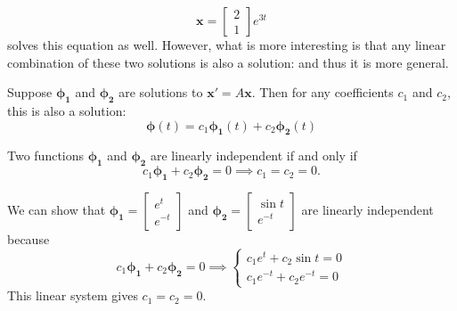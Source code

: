 \begin{itemize}
\begin{example}
              \begin{equation}
                  \bm{x} = \begin{bmatrix}
                      2 \\ 1
                  \end{bmatrix}e^{3t}
              \end{equation}
              solves this equation as well. However, what is more interesting is that any linear combination of these two solutions is also a solution: and thus it is more general.
          \end{example}
          \begin{theorem}
              Suppose $\bm{\phi_1}$ and $\bm{\phi_2}$ are solutions to $\bm{x}'=A\bm{x}$. Then for any coefficients $c_1$ and $c_2$, this is also a solution: 
              \begin{equation}
                  \bm{\phi}(t) = c_1\bm{\phi_1}(t) + c_2\bm{\phi_2}(t)
              \end{equation}
          \end{theorem}
          \begin{definition}
              Two functions $\bm{\phi_1}$ and $\bm{\phi_2}$ are linearly independent if and only if 
              \begin{equation}
                  c_1\bm{\phi_1}+c_2\bm{\phi_2} = 0 \implies c_1=c_2 = 0.
              \end{equation}
          \end{definition}
          \begin{example}
              We can show that $\bm{\phi_1}=\begin{bmatrix}
                  e^t \\ e^{-t}
              \end{bmatrix}$ and $\bm{\phi_2} = \begin{bmatrix}
                  \sin t \\ e^{-t}
              \end{bmatrix}$ are linearly independent because 
              \begin{equation}
                  c_1\bm{\phi_1}+c_2\bm{\phi_2} = 0 \implies \begin{cases}
                      c_1e^t + c_2\sin t = 0 \\ 
                      c_1e^{-t} + c_2e^{-t} = 0
                  \end{cases}
              \end{equation}
              This linear system gives 
              $c_1=c_2=0.$
          \end{example}
\end{itemize}